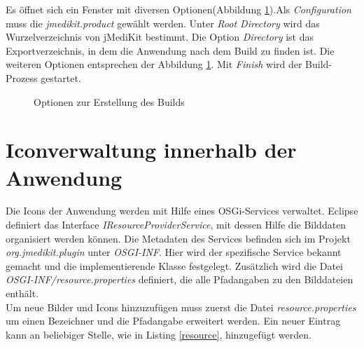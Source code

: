 Es öffnet sich ein Fenster mit diversen Optionen(Abbildung \ref{buildoptions}).Als \textit{Configuration} muss die \textit{jmedikit.product} gewählt werden. Unter \textit{Root Directory} wird das Wurzelverzeichnis von jMediKit bestimmt. Die Option \textit{Directory} ist das Exportverzeichnis, in dem die Anwendung nach dem Build zu finden ist. Die weiteren Optionen entsprechen der Abbildung \ref{buildoptions}. Mit \textit{Finish} wird der Build-Prozess gestartet.

\begin{figure}[H]
  \vspace{0.5cm}
  \centering
  \caption {Optionen zur Erstellung des Builds}
  \label{buildoptions}
  \vspace{0.5cm}
\end{figure}

\chapter{Iconverwaltung innerhalb der Anwendung} \label{importicon}

Die Icons der Anwendung werden mit Hilfe eines OSGi-Services verwaltet. Eclipse definiert das Interface \textit{IResourceProviderService}, mit dessen Hilfe die Bilddaten organisiert werden können. Die Metadaten des Services befinden sich im Projekt \textit{org.jmedikit.plugin} unter \textit{OSGI-INF}. Hier wird der spezifische Service bekannt gemacht und die implementierende Klasse festgelegt. Zusätzlich wird die Datei \textit{OSGI-INF/resource.properties} definiert, die alle Pfadangaben zu den Bilddateien enthält.\\
Um neue Bilder und Icons hinzuzufügen muss zuerst die Datei \textit{resource.properties} um einen Bezeichner und die Pfadangabe erweitert werden. Ein neuer Eintrag kann an beliebiger Stelle, wie in Listing \ref{resource}, hinzugefügt werden.


